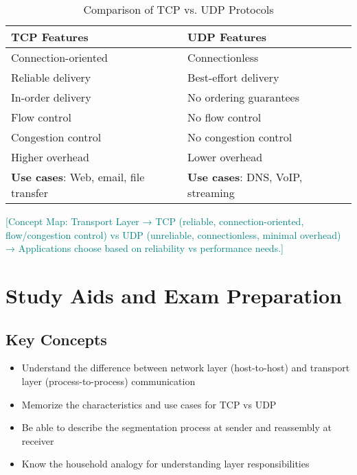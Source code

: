 \documentclass[12pt]{article}
\begin{document}
\begin{table}[h]
    \centering
    \begin{tabular}{p{}p{}}
        \toprule
        \textbf{TCP Features}                         & \textbf{UDP Features}                    \\
        \midrule
        Connection-oriented                           & Connectionless                           \\
        Reliable delivery                             & Best-effort delivery                     \\
        In-order delivery                             & No ordering guarantees                   \\
        Flow control                                  & No flow control                          \\
        Congestion control                            & No congestion control                    \\
        Higher overhead                               & Lower overhead                           \\
        \textbf{Use cases}: Web, email, file transfer & \textbf{Use cases}: DNS, VoIP, streaming \\
        \bottomrule
    \end{tabular}
    \caption{Comparison of TCP vs. UDP Protocols}
    \label{tab:tcp_vs_udp}
\end{table}

\textcolor{teal}{[Concept Map: Transport Layer → TCP (reliable, connection-oriented, flow/congestion control) vs UDP (unreliable, connectionless, minimal overhead) → Applications choose based on reliability vs performance needs.]}

\section{Study Aids and Exam Preparation}

\subsection{Key Concepts}
\begin{itemize}
    \item Understand the difference between network layer (host-to-host) and transport layer (process-to-process) communication
    \item Memorize the characteristics and use cases for TCP vs UDP
    \item Be able to describe the segmentation process at sender and reassembly at receiver
    \item Know the household analogy for understanding layer responsibilities
\end{itemize}
\end{document}
